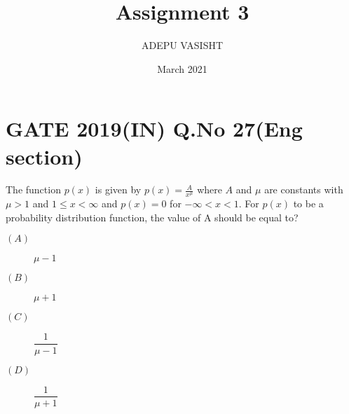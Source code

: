\documentclass[journal,12pt,twocolumn]{IEEEtran}
\title{Assignment 3}
\author{ADEPU VASISHT}
\date{March 2021}
\providecommand{\brak}[1]{\ensuremath{\left(#1\right)}}
\begin{document}
\maketitle

\section*{GATE 2019(IN) Q.No 27(Eng section)}
The function $p\brak{x}$ is given by $p\brak{x} = \frac{A}{x^\mu}$ where $A$ and $\mu$ are constants with $\mu>1$ and $1\leq x<\infty$ and $p\brak{x}= 0$ for $-\infty<x<1$. For $p\brak{x}$ to be a probability distribution function, the value of A should be equal to?

\begin{description}
\item[$\brak{A}$]$\mu -1$\\
\item[$\brak{B}$]$\mu+1$\\
\item[$\brak{C}$]$\dfrac{1}{\mu-1}$\\
\item[$\brak{D}$]$\dfrac{1}{\mu+1}$\\
\end{description}
\end{document}
